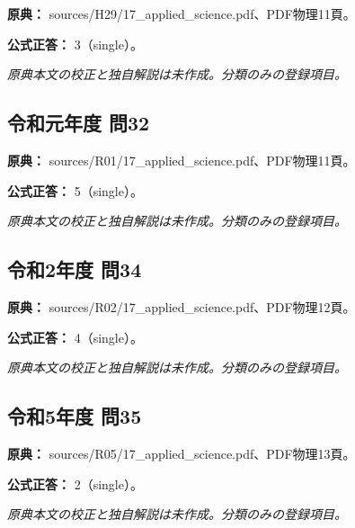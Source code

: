 \noindent\textbf{原典：} sources/H29/17\_applied\_science.pdf、PDF物理11頁。

\textbf{公式正答：} 3（single）。

\par\textit{原典本文の校正と独自解説は未作成。分類のみの登録項目。}

\subsection{令和元年度 問32}
\label{q:r01-reg-applied-32}

\noindent\textbf{原典：} sources/R01/17\_applied\_science.pdf、PDF物理11頁。

\textbf{公式正答：} 5（single）。

\par\textit{原典本文の校正と独自解説は未作成。分類のみの登録項目。}

\subsection{令和2年度 問34}
\label{q:r02-reg-applied-34}

\noindent\textbf{原典：} sources/R02/17\_applied\_science.pdf、PDF物理12頁。

\textbf{公式正答：} 4（single）。

\par\textit{原典本文の校正と独自解説は未作成。分類のみの登録項目。}

\subsection{令和5年度 問35}
\label{q:r05-reg-applied-35}

\noindent\textbf{原典：} sources/R05/17\_applied\_science.pdf、PDF物理13頁。

\textbf{公式正答：} 2（single）。

\par\textit{原典本文の校正と独自解説は未作成。分類のみの登録項目。}
